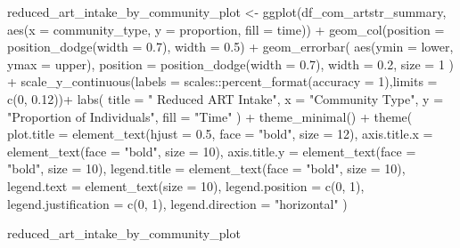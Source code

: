 \documentclass[
  letterpaper,
  DIV=11,
  numbers=noendperiod]{scrartcl}
\newenvironment{Shaded}{\begin{snugshade}}{\end{snugshade}}
\newcommand{\AttributeTok}[1]{\textcolor[rgb]{0.40,0.45,0.13}{#1}}
\newcommand{\DecValTok}[1]{\textcolor[rgb]{0.68,0.00,0.00}{#1}}
\newcommand{\FloatTok}[1]{\textcolor[rgb]{0.68,0.00,0.00}{#1}}
\newcommand{\FunctionTok}[1]{\textcolor[rgb]{0.28,0.35,0.67}{#1}}
\newcommand{\NormalTok}[1]{\textcolor[rgb]{0.00,0.23,0.31}{#1}}
\newcommand{\OtherTok}[1]{\textcolor[rgb]{0.00,0.23,0.31}{#1}}
\newcommand{\SpecialCharTok}[1]{\textcolor[rgb]{0.37,0.37,0.37}{#1}}
\newcommand{\StringTok}[1]{\textcolor[rgb]{0.13,0.47,0.30}{#1}}
\begin{document}
\begin{Shaded}
\begin{Highlighting}[]
\NormalTok{reduced\_art\_intake\_by\_community\_plot }\OtherTok{\textless{}{-}} \FunctionTok{ggplot}\NormalTok{(df\_com\_artstr\_summary, }\FunctionTok{aes}\NormalTok{(}\AttributeTok{x =}\NormalTok{ community\_type, }\AttributeTok{y =}\NormalTok{ proportion, }\AttributeTok{fill =}\NormalTok{ time)) }\SpecialCharTok{+}
  \FunctionTok{geom\_col}\NormalTok{(}\AttributeTok{position =} \FunctionTok{position\_dodge}\NormalTok{(}\AttributeTok{width =} \FloatTok{0.7}\NormalTok{), }\AttributeTok{width =} \FloatTok{0.5}\NormalTok{) }\SpecialCharTok{+}
  \FunctionTok{geom\_errorbar}\NormalTok{(}
    \FunctionTok{aes}\NormalTok{(}\AttributeTok{ymin =}\NormalTok{ lower, }\AttributeTok{ymax =}\NormalTok{ upper),}
    \AttributeTok{position =} \FunctionTok{position\_dodge}\NormalTok{(}\AttributeTok{width =} \FloatTok{0.7}\NormalTok{),}
    \AttributeTok{width =} \FloatTok{0.2}\NormalTok{,}
    \AttributeTok{size =} \DecValTok{1}
\NormalTok{  ) }\SpecialCharTok{+}
  \FunctionTok{scale\_y\_continuous}\NormalTok{(}\AttributeTok{labels =}\NormalTok{ scales}\SpecialCharTok{::}\FunctionTok{percent\_format}\NormalTok{(}\AttributeTok{accuracy =} \DecValTok{1}\NormalTok{),}\AttributeTok{limits =} \FunctionTok{c}\NormalTok{(}\DecValTok{0}\NormalTok{, }\FloatTok{0.12}\NormalTok{))}\SpecialCharTok{+}
  \FunctionTok{labs}\NormalTok{(}
    \AttributeTok{title =} \StringTok{" Reduced ART Intake"}\NormalTok{,}
    \AttributeTok{x =} \StringTok{"Community Type"}\NormalTok{,}
    \AttributeTok{y =} \StringTok{"Proportion of Individuals"}\NormalTok{,}
    \AttributeTok{fill =}  \StringTok{"Time"}
\NormalTok{  ) }\SpecialCharTok{+}
  \FunctionTok{theme\_minimal}\NormalTok{() }\SpecialCharTok{+}
  \FunctionTok{theme}\NormalTok{(}
    \AttributeTok{plot.title =} \FunctionTok{element\_text}\NormalTok{(}\AttributeTok{hjust =} \FloatTok{0.5}\NormalTok{, }\AttributeTok{face =} \StringTok{"bold"}\NormalTok{, }\AttributeTok{size =} \DecValTok{12}\NormalTok{),}
    \AttributeTok{axis.title.x =} \FunctionTok{element\_text}\NormalTok{(}\AttributeTok{face =} \StringTok{"bold"}\NormalTok{, }\AttributeTok{size =} \DecValTok{10}\NormalTok{),}
    \AttributeTok{axis.title.y =} \FunctionTok{element\_text}\NormalTok{(}\AttributeTok{face =} \StringTok{"bold"}\NormalTok{, }\AttributeTok{size =} \DecValTok{10}\NormalTok{),}
    \AttributeTok{legend.title =} \FunctionTok{element\_text}\NormalTok{(}\AttributeTok{face =} \StringTok{"bold"}\NormalTok{, }\AttributeTok{size =} \DecValTok{10}\NormalTok{),}
    \AttributeTok{legend.text =} \FunctionTok{element\_text}\NormalTok{(}\AttributeTok{size =} \DecValTok{10}\NormalTok{),}
    \AttributeTok{legend.position =} \FunctionTok{c}\NormalTok{(}\DecValTok{0}\NormalTok{, }\DecValTok{1}\NormalTok{),}
    \AttributeTok{legend.justification =} \FunctionTok{c}\NormalTok{(}\DecValTok{0}\NormalTok{, }\DecValTok{1}\NormalTok{),}
    \AttributeTok{legend.direction =} \StringTok{"horizontal"}
\NormalTok{  )}

\NormalTok{reduced\_art\_intake\_by\_community\_plot}
\end{Highlighting}
\end{Shaded}
\end{document}
